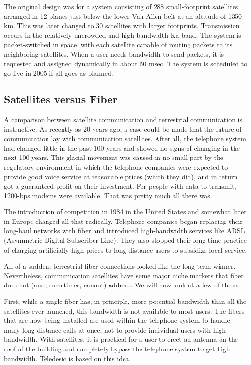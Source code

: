 \documentclass[b5paper,11pt]{memoir}
\begin{document}
The original design was for a system consisting of 288 small-footprint
satellites arranged in 12 planes just below the lower Van Allen belt at
an altitude of 1350 km. This was later changed to 30 satellites with
larger footprints. Transmission occurs in the relatively uncrowded and
high-bandwidth Ka band. The system is packet-switched in space, with
each satellite capable of routing packets to its neighboring satellites.
When a user needs bandwidth to send packets, it is requested and
assigned dynamically in about 50 msec. The system is scheduled to go
live in 2005 if all goes as planned.

\protect\hypertarget{0130661023_ch02lev1sec4.htmlux5cux23ch02lev2sec16}{}{}

\subsection{Satellites versus Fiber}

A comparison between satellite communication and terrestrial
communication is instructive. As recently as 20 years ago, a case could
be made that the future of communication lay with communication
satellites. After all, the telephone system had changed little in the
past 100 years and showed no signs of changing in the next 100 years.
This glacial movement was caused in no small part by the regulatory
environment in which the telephone companies were expected to provide
good voice service at reasonable prices (which they did), and in return
got a guaranteed profit on their investment. For people with data to
transmit, 1200-bps modems were available. That was pretty much all there
was.

The introduction of competition in 1984 in the United States and
somewhat later in Europe changed all that radically. Telephone companies
began replacing their long-haul networks with fiber and introduced
high-bandwidth services like ADSL (Asymmetric Digital Subscriber Line).
They also stopped their long-time practice of charging artificially-high
prices to long-distance users to subsidize local service.

All of a sudden, terrestrial fiber connections looked like the long-term
winner. Nevertheless, communication satellites have some major niche
markets that fiber does not (and, sometimes, cannot) address. We will
now look at a few of these.

First, while a single fiber has, in principle, more potential bandwidth
than all the satellites ever launched, this bandwidth is not available
to most users. The fibers that are now being installed are used within
the telephone system to handle many long distance calls at once, not to
provide individual users with high bandwidth. With satellites, it is
practical for a user to erect an antenna on the roof of the building and
completely bypass the telephone system to get high bandwidth. Teledesic
is based on this idea.
\end{document}
